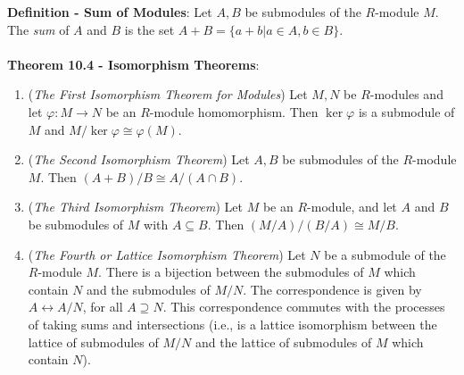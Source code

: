 \documentclass{article}
\begin{document}
\textbf{Definition - Sum of Modules}: Let $A, B$ be submodules of the $R$-module $M$. The \textit{sum} of $A$ and $B$ is the set $A + B = \{a + b | a \in A, b \in B\}$. \\ \\
\textbf{Theorem 10.4 - Isomorphism Theorems}: \begin{enumerate}
    \item (\textit{The First Isomorphism Theorem for Modules}) Let $M, N$ be $R$-modules and let $\varphi: M \rightarrow N$ be an $R$-module homomorphism. Then $\ker \varphi$ is a submodule of $M$ and $M/\ker \varphi \cong \varphi(M)$. 
    \item (\textit{The Second Isomorphism Theorem}) Let $A, B$ be submodules of the $R$-module $M$. Then $(A + B)/B \cong A/(A \cap B)$. 
    \item (\textit{The Third Isomorphism Theorem}) Let $M$ be an $R$-module, and let $A$ and $B$ be submodules of $M$ with $A \subseteq B$. Then $(M/A)/(B/A) \cong M/B$.
    \item (\textit{The Fourth or Lattice Isomorphism Theorem}) Let $N$ be a submodule of the $R$-module $M$. There is a bijection between the submodules of $M$ which contain $N$ and the submodules of $M/N$. The correspondence is given by $A \leftrightarrow A/N$, for all $A \supseteq N$. This correspondence commutes with the processes of taking sums and intersections (i.e., is a lattice isomorphism between the lattice of submodules of $M / N$ and the lattice of submodules of $M$ which contain $N$). 
\end{enumerate} $ $ \\
\end{document}

